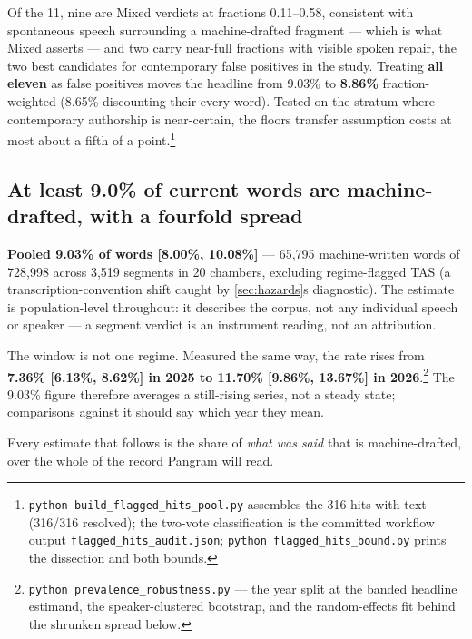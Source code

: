 Of the 11, nine are Mixed verdicts at fractions 0.11--0.58, consistent with
spontaneous speech surrounding a machine-drafted fragment --- which is what Mixed
asserts --- and two carry near-full fractions with visible spoken repair, the two
best candidates for contemporary false positives in the study. Treating \textbf{all
eleven} as false positives moves the headline from 9.03\% to \textbf{8.86\%}
fraction-weighted (8.65\% discounting their every word). Tested on the stratum
where contemporary authorship is near-certain, the floor\textquotesingle s transfer assumption
costs at most about a fifth of a point.\footnote{\texttt{python\ build\_\allowbreak{}flagged\_\allowbreak{}hits\_\allowbreak{}pool.\allowbreak{}py} assembles the 316 hits with
  text (316/316 resolved); the two-vote classification is the committed
  workflow output \texttt{flagged\_\allowbreak{}hits\_\allowbreak{}audit.\allowbreak{}json}; \texttt{python\ flagged\_\allowbreak{}hits\_\allowbreak{}bound.\allowbreak{}py}
  prints the dissection and both bounds.}

\subsection{At least 9.0\% of current words are machine-drafted, with a fourfold spread}\label{sec:prevalence}

\textbf{Pooled 9.03\% of words {[}8.00\%, 10.08\%{]}} --- 65,795 machine-written words of
728,998 across 3,519 segments in 20 chambers, excluding regime-flagged TAS (a
transcription-convention shift caught by \cref{sec:hazards}\textquotesingle s diagnostic).
The estimate is population-level throughout: it describes the corpus, not
any individual speech or speaker --- a segment verdict is an instrument
reading, not an attribution.

The window is not one regime. Measured the same way, the rate rises from
\textbf{7.36\% {[}6.13\%, 8.62\%{]} in 2025 to 11.70\% {[}9.86\%, 13.67\%{]} in 2026}.\footnote{\texttt{python\ prevalence\_\allowbreak{}robustness.\allowbreak{}py} --- the year split at the
  banded headline estimand, the speaker-clustered bootstrap, and the
  random-effects fit behind the shrunken spread below.}
The 9.03\% figure therefore averages a still-rising series, not a steady state;
comparisons against it should say which year they mean.

Every estimate that follows is the share of \emph{what was said} that is
machine-drafted, over the whole of the record Pangram will read.

